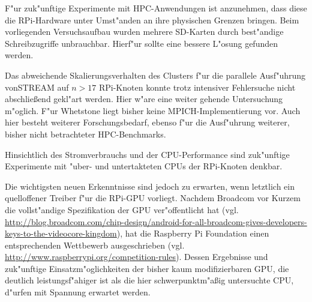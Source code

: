 F"ur zuk"unftige Experimente mit HPC-Anwendungen ist anzunehmen, dass diese die RPi-Hardware unter Umst"anden an ihre physischen Grenzen bringen. Beim vorliegenden Versuchsaufbau wurden mehrere SD-Karten durch best"andige Schreibzugriffe unbrauchbar. Hier\-f"ur sollte eine bessere L"osung gefunden werden. 

Das abweichende Skalierungsverhalten des Clusters f"ur die parallele Ausf"uhrung von\newline STREAM auf $n>17$ RPi-Knoten konnte trotz intensiver Fehlersuche nicht abschlie\ss end gekl"art werden. Hier w"are eine weiter gehende Untersuchung m"oglich. F"ur Whetstone liegt bisher keine MPICH-Implementierung vor. Auch hier besteht weiterer Forschungsbedarf, ebenso f"ur die Ausf"uhrung weiterer, bisher nicht betrachteter HPC-Benchmarks. 

Hinsichtlich des Stromverbrauchs und der CPU-Performance sind zuk"unftige Experimente mit "uber- und untertakteten CPUs der RPi-Knoten denkbar. 

Die wichtigsten neuen Erkenntnisse sind jedoch zu erwarten, wenn letztlich ein quelloffener Treiber f"ur die RPi-GPU vorliegt. Nachdem Broadcom vor Kurzem die vollst"andige Spezifikation der GPU ver"offentlicht hat (vgl. \url{http://blog.broadcom.com/chip-design/android-for-all-broadcom-gives-developers-keys-to-the-videocore-kingdom}), hat die Raspberry Pi Foundation einen entsprechenden Wettbewerb ausgeschrieben (vgl. \url{http://www.raspberrypi.org/competition-rules}). Dessen Ergebnisse und zuk"unftige Einsatz\-m"oglichkeiten der bisher kaum modifizierbaren GPU, die deutlich leistungsf"ahiger ist als die hier schwerpunktm"a\ss ig untersuchte CPU, d"urfen mit Spannung erwartet werden. 
\endinput